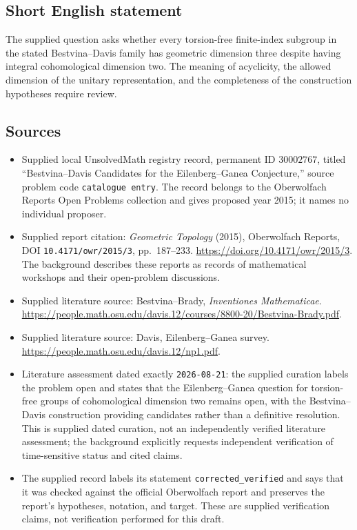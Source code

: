 \documentclass[11pt]{article}
\begin{document}
\subsection{Short English statement}
The supplied question asks whether every torsion-free finite-index subgroup in the stated Bestvina--Davis family has geometric dimension three despite having integral cohomological dimension two. The meaning of acyclicity, the allowed dimension of the unitary representation, and the completeness of the construction hypotheses require review.
\subsection{Sources}
\begin{itemize}
\item Supplied local UnsolvedMath registry record, permanent ID \(30002767\), titled ``Bestvina--Davis Candidates for the Eilenberg--Ganea Conjecture,'' source problem code \texttt{catalogue entry}. The record belongs to the Oberwolfach Reports Open Problems collection and gives proposed year 2015; it names no individual proposer.
\item Supplied report citation: \emph{Geometric Topology} (2015), Oberwolfach Reports, DOI \texttt{10.4171/owr/2015/3}, pp.\ 187--233. \url{https://doi.org/10.4171/owr/2015/3}. The background describes these reports as records of mathematical workshops and their open-problem discussions.
\item Supplied literature source: Bestvina--Brady, \emph{Inventiones Mathematicae}. \url{https://people.math.osu.edu/davis.12/courses/8800-20/Bestvina-Brady.pdf}.
\item Supplied literature source: Davis, Eilenberg--Ganea survey. \url{https://people.math.osu.edu/davis.12/np1.pdf}.
\item Literature assessment dated exactly \texttt{2026-08-21}: the supplied curation labels the problem open and states that the Eilenberg--Ganea question for torsion-free groups of cohomological dimension two remains open, with the Bestvina--Davis construction providing candidates rather than a definitive resolution. This is supplied dated curation, not an independently verified literature assessment; the background explicitly requests independent verification of time-sensitive status and cited claims.
\item The supplied record labels its statement \texttt{corrected\_verified} and says that it was checked against the official Oberwolfach report and preserves the report's hypotheses, notation, and target. These are supplied verification claims, not verification performed for this draft.
\end{itemize}
\end{document}
